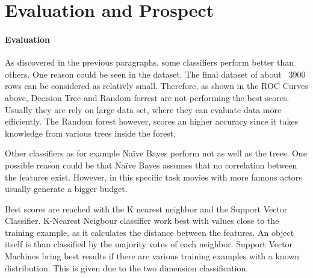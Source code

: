 \section{Evaluation and Prospect}
\paragraph{Evaluation}

\label{cha:prospect}
As discovered in the previous paragraphs, some classifiers perform better than others. One reason could be seen in the dataset. The final dataset of about ~3900 rows can be considered as relativly small. Therefore, as shown in the ROC Curves above, Decision Tree and Random forrest are not performing the best scores. Usually they are rely on large data set, where they can evaluate data more efficiently. The Random forest however, scores an higher accuracy since it takes knowledge from various trees inside the forest.


Other classifiers as for example Na\"{i}ve Bayes perform not as well as the trees. One possible reason could be that Na\"{i}ve Bayes assumes that no correlation between the features exist. However, in this specific task movies with more famous actors usually generate a bigger budget. 

Best scores are reached with the K nearest neighbor and the Support Vector Classifier. K-Nearest Neigbour classifier work best with values close to the training example, as it calculates the distance between the features. An object itself is than classified by the majority votes of each neighbor.
Support Vector Machines bring best results if there are various training examples with a known distribution. This is given due to the two dimension classification. 








